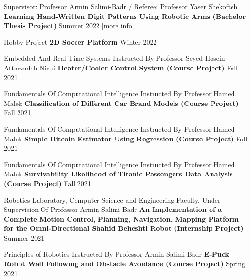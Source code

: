 
\begin{cventries}
    \cventry
    {Supervisor: Professor Armin Salimi-Badr / Referee: Professor Yaser Shekofteh}
    {\textbf {Learning Hand-Written Digit Patterns Using Robotic Arms (Bachelor Thesis Project)}}
    {}
    {Summer 2022}
    {\href{https://ph504.github.io/portfolio/portfolio-1/}{\textcolor{cobalt}{[more info]}}\newline}
    \vspace{0.35 cm}
    
    \cventry
    {Hobby Project}
    {\textbf {2D Soccer Platform}}
    {}
    {Winter 2022}
    {}
    \vspace{0.35 cm}
    
    \cventry
    {Embedded And Real Time Systems Instructed By Professor Seyed-Hosein Attarzadeh-Niaki}
    {\textbf {Heater/Cooler Control System (Course Project)}}
    {}
    {Fall 2021}
    {}
    \vspace{0.35 cm}
    
      \cventry
    {Fundamentals Of Computational Intelligence Instructed By Professor Hamed Malek}
    {\textbf {Classification of Different Car Brand Models (Course Project)}}
    {}
    {Fall 2021}
    {}
    \vspace{0.35 cm}
	
	  \cventry
    {Fundamentals Of Computational Intelligence Instructed By Professor Hamed Malek}
    {\textbf {Simple Bitcoin Estimator Using Regression (Course Project)}}
    {}
    {Fall 2021}
    {}
    \vspace{0.35 cm}
    
      \cventry
    {Fundamentals Of Computational Intelligence Instructed By Professor Hamed Malek}
    {\textbf {Survivability Likelihood of Titanic Passengers Data Analysis (Course Project)}}
    {}
    {Fall 2021}
    {}
    \vspace{0.35 cm}
    
     \cventry
    {Robotics Laboratory, Computer Science and Engineering Faculty, Under Supervision Of Professor Armin Salimi-Badr}
    {\textbf {An Implementation of a Complete Motion Control, Planning, Navigation, Mapping Platform for the Omni-Directional Shahid Beheshti Robot (Internship Project)}}
    {}
    {Summer 2021}
    {}
    \vspace{0.35 cm}
    
    \cventry
    {Principles of Robotics Instructed By Professor Armin Salimi-Badr}
    {\textbf {E-Puck Robot Wall Following and Obstacle Avoidance (Course Project)}}
    {}
    {Spring 2021}
    {}
    \vspace{0.35 cm}
        

\end{cventries}
